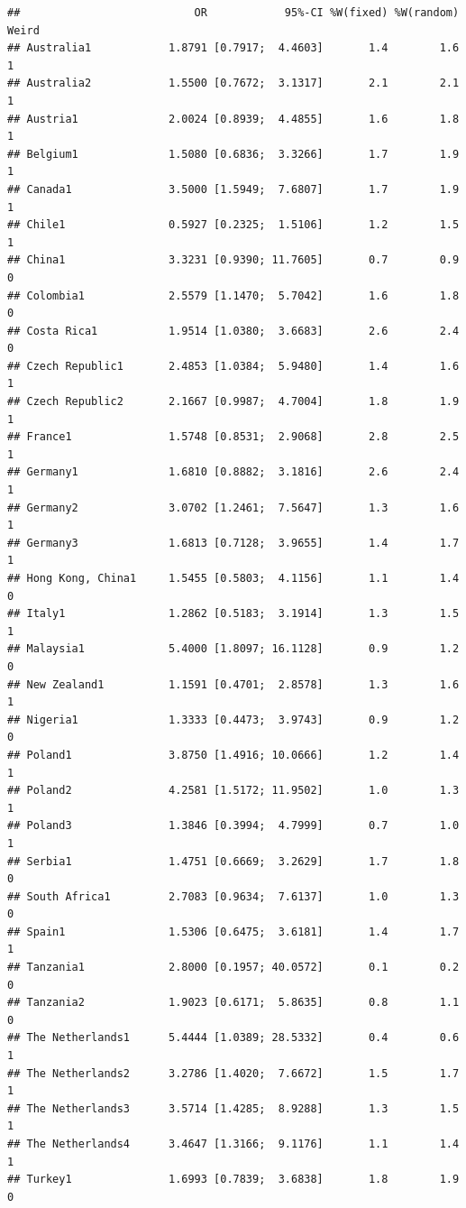 \documentclass[
]{book}
\begin{document}
\begin{verbatim}
##                           OR            95%-CI %W(fixed) %W(random) Weird
## Australia1            1.8791 [0.7917;  4.4603]       1.4        1.6     1
## Australia2            1.5500 [0.7672;  3.1317]       2.1        2.1     1
## Austria1              2.0024 [0.8939;  4.4855]       1.6        1.8     1
## Belgium1              1.5080 [0.6836;  3.3266]       1.7        1.9     1
## Canada1               3.5000 [1.5949;  7.6807]       1.7        1.9     1
## Chile1                0.5927 [0.2325;  1.5106]       1.2        1.5     1
## China1                3.3231 [0.9390; 11.7605]       0.7        0.9     0
## Colombia1             2.5579 [1.1470;  5.7042]       1.6        1.8     0
## Costa Rica1           1.9514 [1.0380;  3.6683]       2.6        2.4     0
## Czech Republic1       2.4853 [1.0384;  5.9480]       1.4        1.6     1
## Czech Republic2       2.1667 [0.9987;  4.7004]       1.8        1.9     1
## France1               1.5748 [0.8531;  2.9068]       2.8        2.5     1
## Germany1              1.6810 [0.8882;  3.1816]       2.6        2.4     1
## Germany2              3.0702 [1.2461;  7.5647]       1.3        1.6     1
## Germany3              1.6813 [0.7128;  3.9655]       1.4        1.7     1
## Hong Kong, China1     1.5455 [0.5803;  4.1156]       1.1        1.4     0
## Italy1                1.2862 [0.5183;  3.1914]       1.3        1.5     1
## Malaysia1             5.4000 [1.8097; 16.1128]       0.9        1.2     0
## New Zealand1          1.1591 [0.4701;  2.8578]       1.3        1.6     1
## Nigeria1              1.3333 [0.4473;  3.9743]       0.9        1.2     0
## Poland1               3.8750 [1.4916; 10.0666]       1.2        1.4     1
## Poland2               4.2581 [1.5172; 11.9502]       1.0        1.3     1
## Poland3               1.3846 [0.3994;  4.7999]       0.7        1.0     1
## Serbia1               1.4751 [0.6669;  3.2629]       1.7        1.8     0
## South Africa1         2.7083 [0.9634;  7.6137]       1.0        1.3     0
## Spain1                1.5306 [0.6475;  3.6181]       1.4        1.7     1
## Tanzania1             2.8000 [0.1957; 40.0572]       0.1        0.2     0
## Tanzania2             1.9023 [0.6171;  5.8635]       0.8        1.1     0
## The Netherlands1      5.4444 [1.0389; 28.5332]       0.4        0.6     1
## The Netherlands2      3.2786 [1.4020;  7.6672]       1.5        1.7     1
## The Netherlands3      3.5714 [1.4285;  8.9288]       1.3        1.5     1
## The Netherlands4      3.4647 [1.3166;  9.1176]       1.1        1.4     1
## Turkey1               1.6993 [0.7839;  3.6838]       1.8        1.9     0

\end{verbatim}
\end{document}
